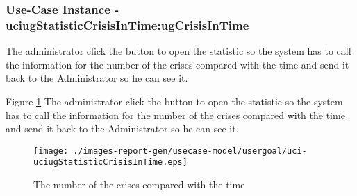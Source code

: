 
	\subsubsection{Use-Case Instance - uciugStatisticCrisisInTime:ugCrisisInTime}
	
	The administrator click the button to open the statistic so the system has to call the information for the number of the crises compared with the time and send it back to the Administrator so he can see it. 		  
	\begin{operationmodel}
	
	\end{operationmodel} 

	
	Figure \ref{fig:lu.uni.lassy.excalibur.examples.icrash-RE-UC-uci-uciugStatisticCrisisInTime}
	The administrator click the button to open the statistic so the system has to call the information for the number of the crises compared with the time and send it back to the Administrator so he can see it. 
	
	\begin{figure}[htbp]
	\begin{center}
	
	\texttt{[image: ./images-report-gen/usecase-model/usergoal/uci-uciugStatisticCrisisInTime.eps]}
	\end{center}
	\caption[lu.uni.lassy.excalibur.examples.icrash Sequence Diagram: uci-uciugStatisticCrisisInTime]{The number of the crises compared with the time}
	\label{fig:lu.uni.lassy.excalibur.examples.icrash-RE-UC-uci-uciugStatisticCrisisInTime}
	\end{figure}
	\vspace{0.5cm}
